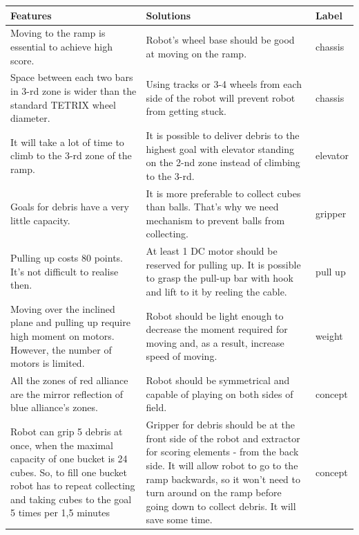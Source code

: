 	\begin{table}[H]
		\vspace{-2mm}
		\begin{center}
			\begin{tabular}{|p{0.4\linewidth}|p{0.5\linewidth}|p{0.1\linewidth}|}
				\hline
				Features & Solutions & Label \\
				\hline
				Moving to the ramp is essential to achieve high score. & Robot's wheel base should be good at moving on the ramp. & chassis \\
				\hline
				Space between each two bars in 3-rd zone is wider than the standard TETRIX wheel diameter. & Using tracks or 3-4 wheels from each side of the robot will prevent robot from getting stuck. & chassis \\
				\hline
				It will take a lot of time to climb to the 3-rd zone of the ramp. & It is possible to deliver debris to the highest goal with elevator standing on the 2-nd zone instead of climbing to the 3-rd. & elevator \\
				\hline
				Goals for debris have a very little capacity. & It is more preferable to collect cubes than balls. That's why we need mechanism to prevent balls from collecting. & gripper \\
				\hline
				Pulling up costs 80 points. It's not difficult to realise then. & At least 1 DC motor should be reserved for pulling up. It is possible to grasp the pull-up bar with hook and lift to it by reeling the cable. & pull up \\
				\hline
				Moving over the inclined plane and pulling up require high moment on motors. However, the number of motors is limited. & Robot should be light enough to decrease the moment required for moving and, as a result, increase speed of moving. & weight \\
				\hline
				All the zones of red alliance are the mirror reflection of blue alliance's zones. & Robot should be symmetrical and capable of playing on both sides of field. & concept \\
				\hline
				Robot can grip 5 debris at once, when the maximal capacity of one bucket is 24 cubes. So, to fill one bucket robot has to repeat collecting and taking cubes to the goal 5 times per 1,5 minutes & Gripper for debris should be at the front side of the robot and extractor for scoring elements - from the back side. It will allow robot to go to the ramp backwards, so it won't need to turn around on the ramp before going down to collect debris. It will save some time. & concept \\

\end{tabular}
\end{center}
\end{table}
